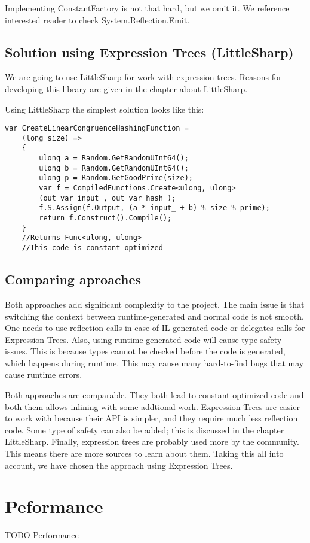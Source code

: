 Implementing ConstantFactory is not that hard, but we omit it. We reference interested reader to check System.Reflection.Emit.

\subsection{Solution using Expression Trees (LittleSharp)}
We are going to use LittleSharp for work with expression trees. Reasons for developing this library are given in the chapter about LittleSharp.

Using LittleSharp the simplest solution looks like this:
\begin{lstlisting}
var CreateLinearCongruenceHashingFunction = 
    (long size) =>
    {
        ulong a = Random.GetRandomUInt64();
        ulong b = Random.GetRandomUInt64();
        ulong p = Random.GetGoodPrime(size);
        var f = CompiledFunctions.Create<ulong, ulong>
        (out var input_, out var hash_);
        f.S.Assign(f.Output, (a * input_ + b) % size % prime);
        return f.Construct().Compile();
    }
    //Returns Func<ulong, ulong>
    //This code is constant optimized
\end{lstlisting}

\subsection{Comparing aproaches}
Both approaches add significant complexity to the project. The main issue is that switching the context between runtime-generated and normal code is not smooth. One needs to use reflection calls in case of IL-generated code or delegates calls for Expression Trees. 
Also, using runtime-generated code will cause type safety issues. This is because types cannot be checked before the code is generated, which happens during runtime. This may cause many hard-to-find bugs that may cause runtime errors.

Both approaches are comparable. They both lead to constant optimized code and both them allows inlining with some addtional work. Expression Trees are easier to work with because their API is simpler, and they require much less reflection code. Some type of safety can also be added; this is discussed in the chapter LittleSharp. Finally, expression trees are probably used more by the community. This means there are more sources to learn about them.
Taking this all into account, we have chosen the approach using Expression Trees.

\section{Peformance}

TODO Performance



